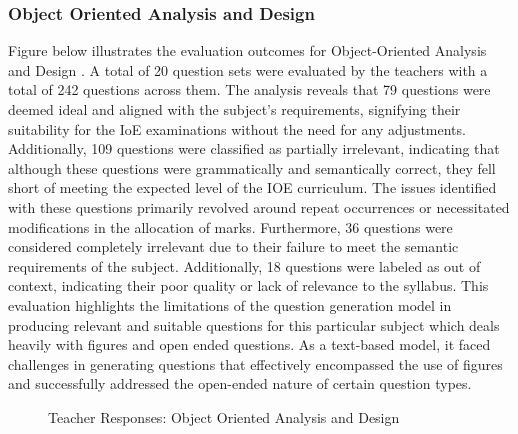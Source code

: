 \documentclass[12pt]{report}
\begin{document}
\subsubsection{Object Oriented Analysis and Design}
Figure below illustrates the evaluation outcomes for Object-Oriented Analysis and Design . A total of 20 question sets were evaluated by the teachers with a total of 242 questions across them. The analysis reveals that 79 questions were deemed ideal and aligned with the subject's requirements, signifying their suitability for the IoE examinations without the need for any adjustments.  Additionally, 109 questions were classified as partially irrelevant, indicating that although these questions were grammatically and semantically correct, they fell short of meeting the expected level of the IOE curriculum. The issues identified with these questions primarily revolved around repeat occurrences or necessitated modifications in the allocation of marks. Furthermore, 36 questions were considered completely irrelevant due to their failure to meet the semantic requirements of the subject. Additionally, 18 questions were labeled as out of context, indicating their poor quality or lack of relevance to the syllabus. This evaluation highlights the limitations of the question generation model in producing relevant and suitable questions for this particular subject which deals heavily with figures and open ended questions.  As a text-based model, it faced challenges in generating questions that effectively encompassed the use of figures and successfully addressed the open-ended nature of certain question types. 
\begin{figure}[!h]
\centering
{}
\caption{Teacher Responses: Object Oriented Analysis and Design}
\label{fig:pie_chart}
\end{figure}
\pagebreak
\end{document}
